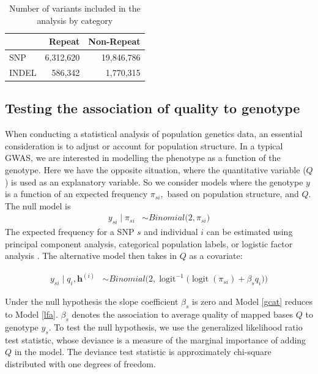 \documentclass[9pt,lineno]{elife}
\newcommand{\logit}{\operatorname{logit}}
\begin{document}
\begin{table}[h]
\begin{tabular}{l  r r}
                      & {Repeat}  & {Non-Repeat}       \\ \hline
{SNP}  & 6,312,620 & 19,846,786   \\  
{INDEL} &  586,342  & 1,770,315 \\ \hline
\end{tabular}
\caption{Number of variants included in the analysis by category}
\label{totTable}
\end{table}

\subsection{Testing the association of quality to genotype}
When conducting a statistical analysis of population genetics data, an essential consideration is  to adjust or account for population structure. In a typical GWAS, we are interested in modelling the phenotype as a function of the genotype. 
Here we have the opposite situation, where the quantitative variable ($Q$) is used as an explanatory variable. 
So we consider models where the genotype $y$ is a function of an expected frequency $\pi_{si},$ based on population structure, and $Q$. 
The null model is 
\begin{align} \label{lfa}
y_{si} \mid \pi_{si}  &\sim Binomial\big( 2, \pi_{si} \big)
\end{align} 
The expected frequency for a SNP $s$ and individual $i$ can be estimated using principal component analysis, categorical population labels, or logistic factor analysis \citep{song2015testing}. The alternative model then takes in $Q$ as a covariate: 

\begin{align}\label{gcat}
 y_{si} \mid q_i, \boldsymbol{h}^{(i)} &\sim Binomial\bigg( 2, \logit^{-1}\Big(\logit(\pi_{si}) + \beta_s q_i\Big) \bigg)
\end{align} 

Under the null hypothesis the slope coefficient $\beta_s$ is zero and Model \ref{gcat} reduces to Model \ref{lfa}. 
$\beta_s$ denotes the association to average quality of mapped bases $Q$ to genotype $y_{s}$. 
To test the null hypothesis, we use the generalized likelihood ratio test statistic, whose deviance is a measure of the marginal importance of adding $Q$ in the model. 
The deviance test statistic is approximately chi-square distributed with one degrees of freedom.
\end{document}
